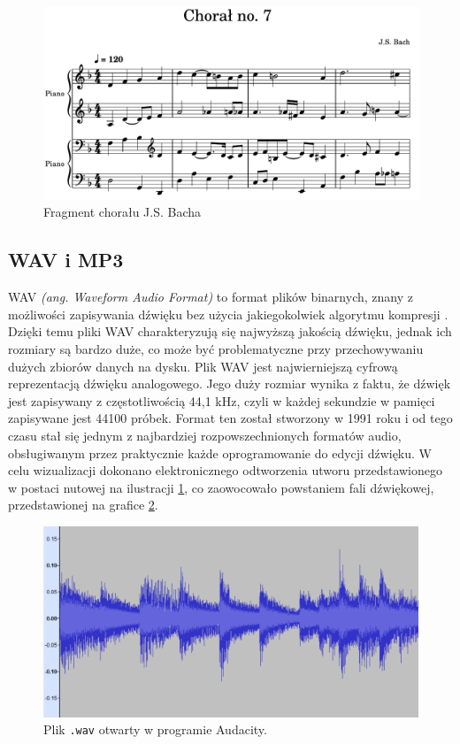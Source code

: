 \documentclass[data-science]{agh-wi} %
\begin{document}
\begin{figure}
    \begin{center}
        \includegraphics[width=0.9\linewidth]{./img/jsb_7_sheet.pdf}
    \end{center}
    \caption{Fragment chorału J.S. Bacha}\label{fig:jsb_sheet}
\end{figure}
\subsection{WAV i MP3}
WAV \textit{(ang. Waveform Audio Format)} to format plików binarnych, znany z możliwości zapisywania dźwięku bez użycia jakiegokolwiek algorytmu kompresji \cite{wav_specification}. Dzięki temu pliki WAV charakteryzują się najwyższą jakością dźwięku, jednak ich rozmiary są bardzo duże, co może być problematyczne przy przechowywaniu dużych zbiorów danych na dysku. Plik WAV jest najwierniejszą cyfrową reprezentacją dźwięku analogowego. Jego duży rozmiar wynika z faktu, że dźwięk jest zapisywany z częstotliwością 44,1 kHz, czyli w każdej sekundzie w pamięci zapisywane jest 44100 próbek. Format ten został stworzony w 1991 roku i od tego czasu stał się jednym z najbardziej rozpowszechnionych formatów audio, obsługiwanym przez praktycznie każde oprogramowanie do edycji dźwięku. W celu wizualizacji dokonano elektronicznego odtworzenia utworu przedstawionego w postaci nutowej na ilustracji \ref*{fig:jsb_sheet}, co zaowocowało powstaniem fali dźwiękowej, przedstawionej na grafice \ref*{fig:jsb_wav}.

\begin{figure}
    \begin{center}
        \includegraphics[width=\linewidth]{./img/jsb_wav.png}
    \end{center}
    \caption{Plik \texttt{.wav} otwarty w programie Audacity.}\label{fig:jsb_wav}
\end{figure}
\end{document}
